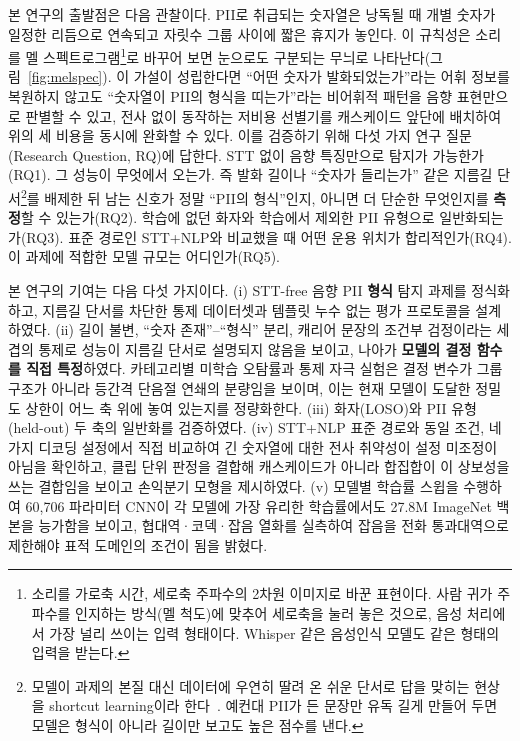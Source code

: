 \documentclass[10pt,twocolumn]{article}
\renewcommand{\emph}[1]{\textbf{#1}}
\begin{document}
본 연구의 출발점은 다음 관찰이다. PII로 취급되는 숫자열은 낭독될 때 개별 숫자가 일정한
리듬으로 연속되고 자릿수 그룹 사이에 짧은 휴지가 놓인다. 이 규칙성은 소리를 멜
스펙트로그램\footnote{소리를 가로축 시간, 세로축 주파수의 2차원 이미지로 바꾼 표현이다. 사람
귀가 주파수를 인지하는 방식(멜 척도)에 맞추어 세로축을 눌러 놓은 것으로, 음성 처리에서 가장
널리 쓰이는 입력 형태이다. Whisper 같은 음성인식 모델도 같은 형태의 입력을 받는다.}로 바꾸어
보면 눈으로도 구분되는 무늬로 나타난다(그림~\ref{fig:melspec}). 이 가설이 성립한다면 ``어떤 숫자가 발화되었는가''라는 어휘
정보를 복원하지 않고도 ``숫자열이 PII의 형식을 띠는가''라는 비어휘적 패턴을 음향 표현만으로
판별할 수 있고, 전사 없이 동작하는 저비용 선별기를 캐스케이드 앞단에 배치하여 위의 세
비용을 동시에 완화할 수 있다. 이를 검증하기 위해 다섯 가지 연구 질문(Research Question,
RQ)에 답한다. STT 없이 음향 특징만으로 탐지가 가능한가(RQ1). 그 성능이 무엇에서 오는가. 즉 발화 길이나 ``숫자가 들리는가'' 같은
지름길 단서\footnote{모델이 과제의 본질 대신 데이터에 우연히 딸려 온 쉬운 단서로 답을 맞히는
현상을 shortcut learning이라 한다~\cite{geirhos2020shortcut}. 예컨대 PII가 든 문장만 유독
길게 만들어 두면 모델은 형식이 아니라 길이만 보고도 높은 점수를 낸다.}를 배제한 뒤 남는
신호가 정말 ``PII의 형식''인지, 아니면 더 단순한 무엇인지를 \emph{측정}할 수 있는가(RQ2). 학습에 없던 화자와 학습에서 제외한 PII 유형으로 일반화되는가(RQ3). 표준 경로인
STT+NLP와 비교했을 때 어떤 운용 위치가 합리적인가(RQ4). 이 과제에 적합한 모델 규모는
어디인가(RQ5).

본 연구의 기여는 다음 다섯 가지이다. (i) STT-free 음향 PII \emph{형식} 탐지 과제를
정식화하고, 지름길 단서를 차단한 통제 데이터셋과 템플릿 누수 없는 평가 프로토콜을
설계하였다. (ii) 길이 불변, ``숫자 존재''--``형식'' 분리, 캐리어 문장의 조건부 검정이라는
세 겹의 통제로 성능이 지름길 단서로 설명되지 않음을 보이고, 나아가 \emph{모델의 결정 함수를
직접 특정}하였다. 카테고리별 미학습 오탐률과 통제 자극 실험은 결정 변수가 그룹 구조가 아니라
등간격 단음절 연쇄의 분량임을 보이며, 이는 현재 모델이 도달한 정밀도 상한이 어느 축 위에
놓여 있는지를 정량화한다. (iii) 화자(LOSO)와 PII 유형(held-out) 두 축의 일반화를 검증하였다.
(iv) STT+NLP 표준 경로와 동일 조건, 네 가지 디코딩 설정에서 직접 비교하여 긴 숫자열에 대한
전사 취약성이 설정 미조정이 아님을 확인하고, 클립 단위 판정을 결합해 캐스케이드가 아니라 합집합이
이 상보성을 쓰는 결합임을 보이고 손익분기 모형을 제시하였다. (v) 모델별 학습률 스윕을 수행하여 60{,}706 파라미터 CNN이 각
모델에 가장 유리한 학습률에서도 27.8M ImageNet 백본을 능가함을 보이고, 협대역·코덱·잡음
열화를 실측하여 잡음을 전화 통과대역으로 제한해야 표적 도메인의 조건이 됨을 밝혔다.
\end{document}
